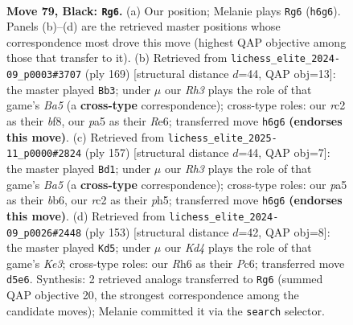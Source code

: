 \documentclass[11pt]{article}
\begin{document}
\clearpage

\begin{figure}[p]\centering
\begin{subfigure}{0.46\textwidth}\centering
\resizebox{\linewidth}{!}{%
\newchessgame
\chessboard[
  setfen={8/8/p6r/Pppk1p1p/2p2P1P/4PKP1/1PR5/8 b - - 4 79},
  showmover=false,
  pgfstyle=straightmove, color=movearrow, markmove={h6-g6}
]}
\caption{}
\end{subfigure}\hfill
\begin{subfigure}{0.46\textwidth}\centering
\resizebox{\linewidth}{!}{%
\newchessgame
\chessboard[
  setfen={5B2/6p1/4r1k1/1p1p1p1p/b2P1K1P/P1P2PP1/8/2R5 b - - 64 85},
  showmover=false,
  pgfstyle=straightmove, color=movearrow, markmove={a4-b3}
]}
\caption{}
\end{subfigure}
\\[4pt]
\begin{subfigure}{0.46\textwidth}\centering
\resizebox{\linewidth}{!}{%
\newchessgame
\chessboard[
  setfen={8/5kp1/pB3p1p/1p1p3P/b2P2P1/P1P2PK1/8/8 b - - 38 79},
  showmover=false,
  pgfstyle=straightmove, color=movearrow, markmove={a4-d1}
]}
\caption{}
\end{subfigure}\hfill
\begin{subfigure}{0.46\textwidth}\centering
\resizebox{\linewidth}{!}{%
\newchessgame
\chessboard[
  setfen={8/8/2p1kp2/1p3p1p/1P1Pp2P/2P1K1P1/5P2/8 b - - 3 77},
  showmover=false,
  pgfstyle=straightmove, color=movearrow, markmove={e6-d5}
]}
\caption{}
\end{subfigure}
\caption{\textbf{Move 79, Black: \texttt{Rg6}.} (a) Our position; Melanie plays \texttt{Rg6} (\texttt{h6g6}). Panels (b)--(d) are the retrieved master positions whose correspondence most drove this move (highest QAP objective among those that transfer to it). (b) Retrieved from \texttt{lichess\_elite\_2024-09\_p0003\#3707} (ply 169) [structural distance $d$=44, QAP obj=13]: the master played \texttt{Bb3}; under $\mu$ our \emph{Rh3} plays the role of that game's \emph{Ba5} (a \textbf{cross-type} correspondence); cross-type roles: our \emph{r}c2 as their \emph{b}f8, our \emph{p}a5 as their \emph{R}e6; transferred move \texttt{h6g6} \textbf{(endorses this move)}. (c) Retrieved from \texttt{lichess\_elite\_2025-11\_p0000\#2824} (ply 157) [structural distance $d$=44, QAP obj=7]: the master played \texttt{Bd1}; under $\mu$ our \emph{Rh3} plays the role of that game's \emph{Ba5} (a \textbf{cross-type} correspondence); cross-type roles: our \emph{p}a5 as their \emph{b}b6, our \emph{r}c2 as their \emph{p}h5; transferred move \texttt{h6g6} \textbf{(endorses this move)}. (d) Retrieved from \texttt{lichess\_elite\_2024-09\_p0026\#2448} (ply 153) [structural distance $d$=42, QAP obj=8]: the master played \texttt{Kd5}; under $\mu$ our \emph{Kd4} plays the role of that game's \emph{Ke3}; cross-type roles: our \emph{R}h6 as their \emph{P}c6; transferred move \texttt{d5e6}. Synthesis: 2 retrieved analogs transferred to \texttt{Rg6} (summed QAP objective 20, the strongest correspondence among the candidate moves); Melanie committed it via the \texttt{search} selector.}
\label{fig:thought-m157}
\end{figure}
\end{document}
